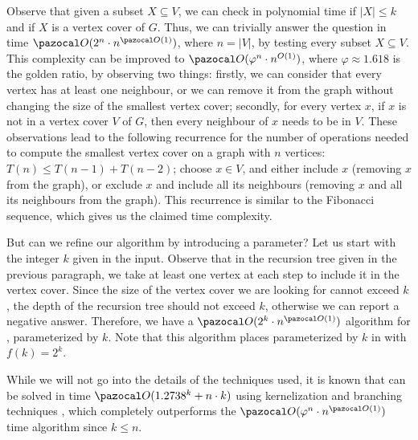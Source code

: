 Observe that given a subset $X \subseteq V$, we can check in polynomial time if $|X| \leq k$ and if $X$ is a vertex cover of $G$. Thus, we can trivially answer the question in time $\O(2^n \cdot n^{\O(1)})$, where $n = |V|$, by testing every subset $X \subseteq V$. This complexity can be improved to $\O(\varphi^n \cdot n^{O(1)})$, where $\varphi \approx 1.618$ is the golden ratio, by observing two things: firstly, we can consider that every vertex has at least one neighbour, or we can remove it from the graph without changing the size of the smallest vertex cover; secondly, for every vertex $x$, if $x$ is not in a vertex cover $V$ of $G$, then every neighbour of $x$ needs to be in $V$. These observations lead to the following recurrence for the number of operations needed to compute the smallest vertex cover on a graph with $n$ vertices: $T(n) \leq T(n - 1) + T(n - 2)$; choose $x \in V$, and either include $x$ (removing $x$ from the graph), or exclude $x$ and include all its neighbours (removing $x$ and all its neighbours from the graph). This recurrence is similar to the Fibonacci sequence, which gives us the claimed time complexity.

\medskip

But can we refine our algorithm by introducing a parameter? Let us start with the integer $k$ given in the input. Observe that in the recursion tree given in the previous paragraph, we take at least one vertex at each step to include it in the vertex cover. Since the size of the vertex cover we are looking for cannot exceed $k$, the depth of the recursion tree should not exceed $k$, otherwise we can report a negative answer. Therefore, we have a $\O(2^k \cdot n^{\O(1)})$ algorithm for , parameterized by $k$. Note that this algorithm places  parameterized by $k$ in  with $f(k) = 2^k$.

While we will not go into the details of the techniques used, it is known that  can be solved in time $\O(1.2738^k + n\cdot k)$ using kernelization and branching techniques \cite{chen2006improved}, which completely outperforms the $\O(\varphi^n \cdot n^{\O(1)})$ time algorithm since $k \leq n$.

\medskip

